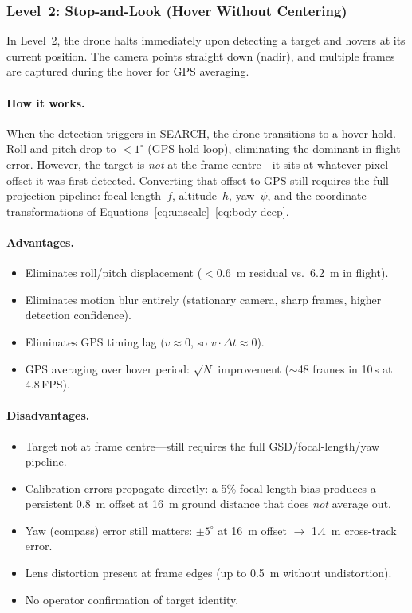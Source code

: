 \subsubsection{Level~2: Stop-and-Look (Hover Without Centering)}\label{sec:hover-in-place}

In Level~2, the drone halts immediately upon detecting a target and hovers at its current position.  The camera points straight down (nadir), and multiple frames are captured during the hover for GPS averaging.

\paragraph{How it works.}  When the detection triggers in SEARCH, the drone transitions to a hover hold.  Roll and pitch drop to $<1^{\circ}$ (GPS hold loop), eliminating the dominant in-flight error.  However, the target is \emph{not} at the frame centre---it sits at whatever pixel offset it was first detected.  Converting that offset to GPS still requires the full projection pipeline: focal length~$f$, altitude~$h$, yaw~$\psi$, and the coordinate transformations of Equations~\ref{eq:unscale}--\ref{eq:body-deep}.

\paragraph{Advantages.}
\begin{itemize}
  \item Eliminates roll/pitch displacement ($<$\SI{0.6}{\metre} residual vs.\ \SI{6.2}{\metre} in flight).
  \item Eliminates motion blur entirely (stationary camera, sharp frames, higher detection confidence).
  \item Eliminates GPS timing lag ($v \approx 0$, so $v \cdot \Delta t \approx 0$).
  \item GPS averaging over hover period: $\sqrt{N}$ improvement ($\sim$48 frames in 10\,s at 4.8\,FPS).
\end{itemize}

\paragraph{Disadvantages.}
\begin{itemize}
  \item Target not at frame centre---still requires the full GSD/focal-length/yaw pipeline.
  \item Calibration errors propagate directly: a 5\% focal length bias produces a persistent \SI{0.8}{\metre} offset at \SI{16}{\metre} ground distance that does \emph{not} average out.
  \item Yaw (compass) error still matters: $\pm5^{\circ}$ at \SI{16}{\metre} offset $\to$ \SI{1.4}{\metre} cross-track error.
  \item Lens distortion present at frame edges (up to \SI{0.5}{\metre} without undistortion).
  \item No operator confirmation of target identity.
\end{itemize}


